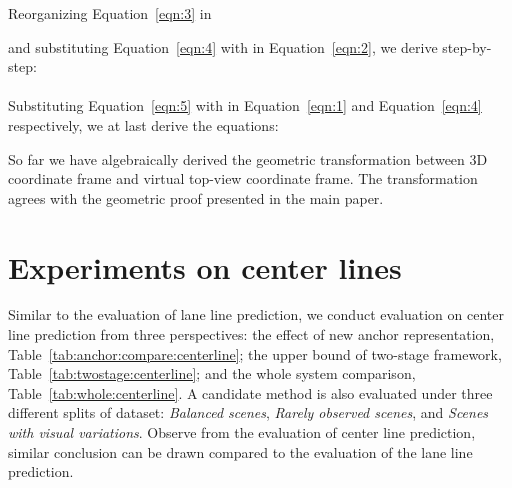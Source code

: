 \documentclass[10pt,twocolumn,letterpaper]{article}
\begin{document}
Reorganizing Equation~\ref{eqn:3} in

\noindent and substituting Equation~\ref{eqn:4} with  in Equation~\ref{eqn:2}, we derive  step-by-step:
\\

\\
Substituting Equation~\ref{eqn:5} with  in Equation~\ref{eqn:1} and Equation~\ref{eqn:4} respectively, we at last derive the equations:

So far we have algebraically derived the geometric transformation between 3D coordinate frame and virtual top-view coordinate frame. The transformation agrees with the geometric proof presented in the main paper.





\section{Experiments on center lines}
\label{sec:exp:centerline}



Similar to the evaluation of lane line prediction, we conduct evaluation on center line prediction from three perspectives: the effect of new anchor representation, Table~\ref{tab:anchor:compare:centerline}; the upper bound of two-stage framework, Table~\ref{tab:twostage:centerline}; and the whole system comparison, Table~\ref{tab:whole:centerline}. A candidate method is also evaluated under three different splits of dataset: {\it Balanced scenes}, {\it Rarely observed scenes}, and {\it Scenes with visual variations}. Observe from the evaluation of center line prediction, similar conclusion can be drawn compared to the evaluation of the lane line prediction.
\end{document}
